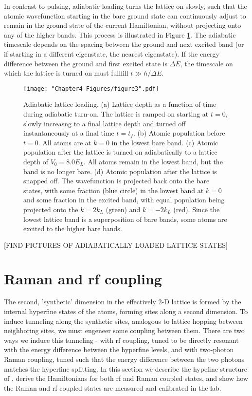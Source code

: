 In contrast to pulsing, adiabatic loading turns the lattice on slowly, such that the atomic wavefunction starting in the bare ground state can continuously adjust to remain in the ground state of the current Hamiltonian, without projecting onto any of the higher bands. This process is illustrated in Figure \ref{fig:pulsingSchematic}. The adiabatic timescale depends on the spacing between the ground and next excited band (or if starting in a different eigenstate, the nearest eigenstate). If the energy difference between the ground and first excited state is $\Delta E$, the timescale on which the lattice is turned on must fullfill $t \gg h/\Delta E$.  

\begin{figure}
\texttt{[image: "Chapter4 Figures/figure3".pdf]}
\caption{Adiabatic lattice loading. (a) Lattice depth as a function of time during adiabatic turn-on. The lattice is ramped on starting at $t=0$, slowly increasng to a final lattice depth and turned off instantaneously at a final time $t=t_f$. (b) Atomic population before $t=0$. All atoms are at $k=0$ in the lowest bare band. (c) Atomic population after the lattice is turned on adiabatically to a lattice depth of $V_0 = 8.0 E_L$. All atoms remain in the lowest band, but the band is no longer bare. (d) Atomic population after the lattice is snapped off. The wavefunction is projected back onto the bare states, with some fraction (blue circle) in the lowest band at $k=0$ and some fraction in the excited band, with equal population being projected onto the $k = 2 k_L$ (green) and $k=-2k_L$ (red). Since the lowest lattice band is a superposition of bare bands, some atoms are excited to the higher bare bands. }
\label{fig:pulsingSchematic}
\end{figure}

[FIND PICTURES OF ADIABATICALLY LOADED LATTICE STATES]



\section{Raman and rf coupling}\label{chap:4sec:rf}

	The second, 'synthetic' dimension in the effectively 2-D lattice is formed by the internal hyperfine states of the atoms, forming sites along a second dimension. To induce tunneling along the synthetic sites, analogous to lattice hopping between neighboring sites, we must engeneer some coupling between them. There are two ways we induce this tunneling - with rf coupling, tuned to be directly resonant with the energy difference between the hyperfine levels, and with two-photon Raman coupling, tuned such that the energy difference between the two photons matches the hyperfine splitting. In this section we describe the hypefine structure of \Rb{}, derive the Hamiltonians for both rf and Raman coupled states, and show how the Raman and rf coupled states are measured and calibrated in the lab.


